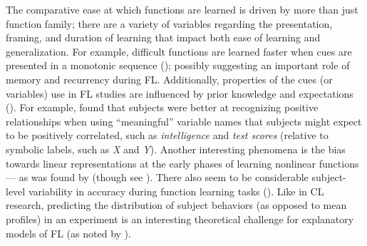 \documentclass[12pt]{article}
\let\oldcite=\cite
\let\oldtextcite=\textcite
\renewcommand{\cite}[1]{\textcolor[rgb]{0, .121, .388}{\oldcite{#1}}}
\renewcommand{\textcite}[1]{\textcolor[rgb]{0, .121, .388}{\oldtextcite{#1}}}
\begin{document}
The comparative ease at which functions are learned is driven by more than just function family; there are a variety of variables regarding the presentation, framing, and duration of learning that impact both ease of learning and generalization. For example, difficult functions are learned faster when cues are presented in a monotonic sequence (\cite{byun1996interaction,delosh1995hypothesis}); possibly suggesting an important role of memory and recurrency during FL. Additionally, properties of the cues (or variables) use in FL studies are influenced by prior knowledge and expectations (\cite{byun1996interaction,koele1980influence,miller1971labels}). For example, \textcite{koele1980influence} found that subjects were better at recognizing positive relationships when using ``meaningful'' variable names that subjects might expect to be positively correlated, such as \emph{intelligence} and \emph{test scores} (relative to symbolic labels, such as \emph{X} and \emph{Y}). Another interesting phenomena is the bias towards linear representations at the early phases of learning nonlinear functions --- as was found by \textcite{summers1969judgments} (though see \cite{koh1991function}). There also seem to be considerable subject-level variability in accuracy during function learning tasks (\cite{delosh1997extrapolation,mcdaniel2014individual}). Like in CL research, predicting the distribution of subject behaviors (as opposed to mean profiles) in an experiment is an interesting theoretical challenge for explanatory models of FL (as noted by \cite{kalish2004population,lucas2015rational}).
\end{document}
